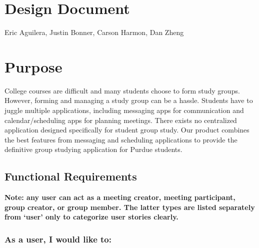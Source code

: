 \documentclass[12pt]{article}
\newcommand{\hwTitle}{Design Document}
\newcommand{\authorName}{Eric Aguilera, Justin Bonner, Carson Harmon, Dan Zheng}
\begin{document}
\section*{\Large \centering \hwTitle}
{\centering \authorName \par}

\section{Purpose}
College courses are difficult and many students choose to form study groups. However, forming and managing a study group can be a hassle. Students have to juggle multiple applications, including messaging apps for communication and calendar/scheduling apps for planning meetings. There exists no centralized application designed specifically for student group study. Our product combines the best features from messaging and scheduling applications to provide the definitive group studying application for Purdue students.

\subsection*{Functional Requirements}

\textbf{Note: any user can act as a meeting creator, meeting participant, group creator, or group member. The latter types are listed separately from ‘user' only to categorize user stories clearly.}

\subsubsection*{As a user, I would like to:}
\end{document}
